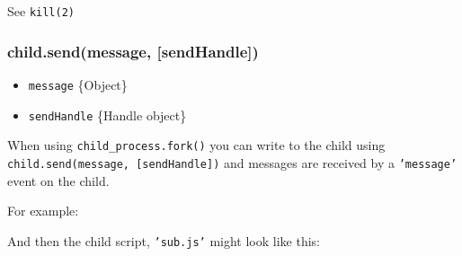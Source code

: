 See \texttt{kill(2)}

\subsubsection{child.send(message, {[}sendHandle{]})}

\begin{itemize}
\item
  \texttt{message} \{Object\}
\item
  \texttt{sendHandle} \{Handle object\}
\end{itemize}

When using \texttt{child\_process.fork()} you can write to the child
using \texttt{child.send(message, {[}sendHandle{]})} and messages are
received by a \texttt{'message'} event on the child.

For example:

\begin{Shaded}
\begin{Highlighting}[]
 \NormalTok{);}

 \NormalTok{);}

\NormalTok{(}\NormalTok{, }
  \NormalTok{(}
\NormalTok{\});}

\NormalTok{(\{ }\NormalTok{: } \NormalTok{\});}
\end{Highlighting}
\end{Shaded}

And then the child script, \texttt{'sub.js'} might look like this:

\begin{Shaded}
\begin{Highlighting}[]
\NormalTok{(}\NormalTok{, }
  \NormalTok{(}
\NormalTok{\});}

\NormalTok{(\{ }\NormalTok{: } \NormalTok{\});}
\end{Highlighting}
\end{Shaded}

